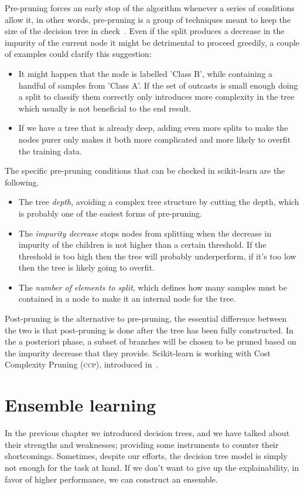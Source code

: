 Pre-pruning forces an early stop of the algorithm whenever a series of conditions allow it, in other
words, pre-pruning is a group of techniques meant to keep the size of the decision tree in
check~\cite{ZhouZhi-Hua2021ML, bramer2007principles, fisher1996learning}. Even if the split produces a decrease in the impurity of the current node it might be detrimental to proceed greedily, a couple of examples could clarify this suggestion:
\begin{itemize}
	\item It might happen that the node is labelled 'Class B', while containing a handful of
		samples from 'Class A'. If the set of outcasts is small enough doing a split to
		classify them correctly only introduces more complexity in the tree which usually is
		not beneficial to the end result.

	\item If we have a tree that is already deep, adding even more splits to make the nodes purer
		only makes it both more complicated and more likely to overfit the training data.
\end{itemize}

The specific pre-pruning conditions that can be checked in scikit-learn are the following.
\begin{itemize}
	\item The tree \emph{depth}, avoiding a complex tree structure by cutting the depth, which is
	      probably one of the easiest forms of pre-pruning.
	\item The \emph{impurity decrease} stops nodes from splitting when the decrease in impurity
	      of the children is not higher than a certain threshold. If the threshold is too high
	      then the tree will probably underperform, if it's too low then the tree is likely going to
	      overfit.
	\item The \emph{number of elements to split}, which defines how many samples must be
		contained in a node to make it an internal node for the tree.
\end{itemize}

Post-pruning is the alternative to pre-pruning, the essential difference between the two is that
post-pruning is done after the tree has been fully constructed. In the a posteriori phase,
a subset of branches will be chosen to be pruned based on the impurity decrease that they provide.
Scikit-learn is working with Cost Complexity Pruning (\textsc{ccp}), introduced in~\cite{breiman1984classification}.

\section{Ensemble learning}
\label{sec:el}
In the previous chapter we introduced decision trees, and we have talked about their
strengths and weaknesses; providing some instruments to counter their shortcomings. Sometimes,
despite our efforts, the decision tree model is simply not enough for the task at hand. If we don't
want to give up the explainability, in favor of higher performance, we can construct an ensemble.

